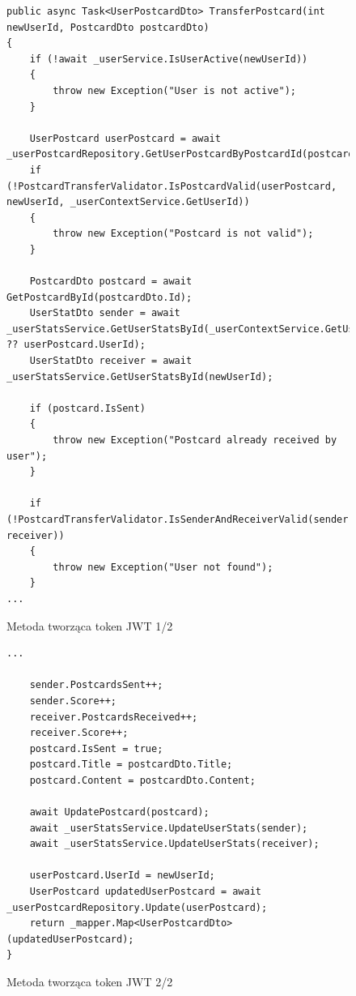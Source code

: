 \documentclass[a4paper,twoside,12pt]{book}
\begin{document}
        \begin{figure}[H]
        \begin{lstlisting}
public async Task<UserPostcardDto> TransferPostcard(int newUserId, PostcardDto postcardDto)
{
    if (!await _userService.IsUserActive(newUserId))
    {
        throw new Exception("User is not active");
    }

    UserPostcard userPostcard = await _userPostcardRepository.GetUserPostcardByPostcardId(postcardDto.Id);
    if (!PostcardTransferValidator.IsPostcardValid(userPostcard, newUserId, _userContextService.GetUserId))
    {
        throw new Exception("Postcard is not valid");
    }

    PostcardDto postcard = await GetPostcardById(postcardDto.Id);
    UserStatDto sender = await _userStatsService.GetUserStatsById(_userContextService.GetUserId ?? userPostcard.UserId);
    UserStatDto receiver = await _userStatsService.GetUserStatsById(newUserId);

    if (postcard.IsSent)
    {
        throw new Exception("Postcard already received by user");
    }

    if (!PostcardTransferValidator.IsSenderAndReceiverValid(sender, receiver))
    {
        throw new Exception("User not found");
    }
...
        \end{lstlisting}
    \caption{Metoda tworząca token JWT 1/2}
    \label{fig:pseudokod:listings}
    \end{figure}

    \begin{figure}[H]
        \begin{lstlisting}
...
        
    sender.PostcardsSent++;
    sender.Score++;
    receiver.PostcardsReceived++;
    receiver.Score++;
    postcard.IsSent = true;
    postcard.Title = postcardDto.Title;
    postcard.Content = postcardDto.Content;

    await UpdatePostcard(postcard);
    await _userStatsService.UpdateUserStats(sender);
    await _userStatsService.UpdateUserStats(receiver);

    userPostcard.UserId = newUserId;
    UserPostcard updatedUserPostcard = await _userPostcardRepository.Update(userPostcard);
    return _mapper.Map<UserPostcardDto>(updatedUserPostcard);
}
        \end{lstlisting}
    \caption{Metoda tworząca token JWT 2/2}
    \label{fig:pseudokod:listings}
    \end{figure}
\end{document}
